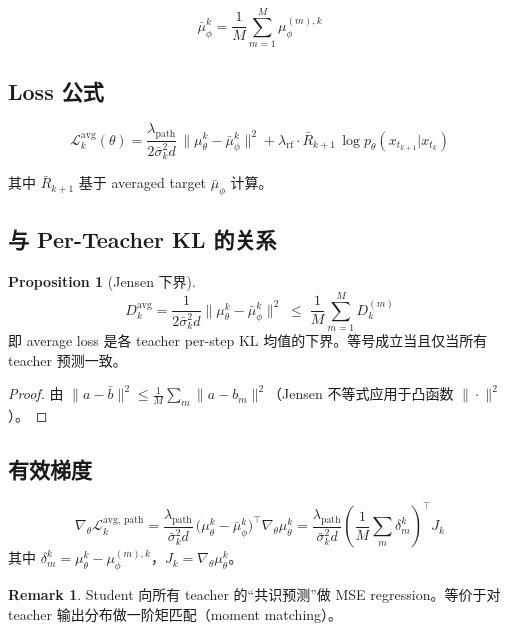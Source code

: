 \documentclass[11pt,a4paper]{article}
\newcommand{\loss}{\mathcal{L}}
\newcommand{\mutheta}{\mu_\theta}
\newcommand{\muphi}{\mu_\phi}
\newcommand{\mubar}{\bar{\mu}_\phi}
\newcommand{\sigbar}{\bar{\sigma}}
\newcommand{\Rbar}{\bar{R}}
\newcommand{\lpath}{\lambda_{\mathrm{path}}}
\newcommand{\lrf}{\lambda_{\mathrm{rf}}}
\theoremstyle{definition}
\newtheorem{remark}{Remark}
\newtheorem{proposition}{Proposition}
\begin{document}
\begin{equation}
\mubar^k = \frac{1}{M}\sum_{m=1}^M \muphi^{(m),k}
\label{eq:mu_avg}
\end{equation}

\subsection{Loss 公式}

\begin{equation}
\boxed{
\loss_k^{\mathrm{avg}}(\theta) = \frac{\lpath}{2\sigbar_k^2 d}\,\bigl\|\mutheta^k - \mubar^k\bigr\|^2
+ \lrf \cdot \Rbar_{k+1}\,\log p_\theta(x_{t_{k+1}}|x_{t_k})
}
\label{eq:loss_avg}
\end{equation}

其中 $\Rbar_{k+1}$ 基于 averaged target $\mubar$ 计算。

\subsection{与 Per-Teacher KL 的关系}

\begin{proposition}[Jensen 下界]
\begin{equation}
D_k^{\mathrm{avg}} = \frac{1}{2\sigbar_k^2 d}\|\mutheta^k - \mubar^k\|^2
\;\leq\; \frac{1}{M}\sum_{m=1}^M D_k^{(m)}
\end{equation}
即 average loss 是各 teacher per-step KL 均值的下界。等号成立当且仅当所有 teacher 预测一致。
\end{proposition}

\begin{proof}
由 $\|a - \bar{b}\|^2 \leq \frac{1}{M}\sum_m \|a - b_m\|^2$（Jensen 不等式应用于凸函数 $\|\cdot\|^2$）。
\end{proof}

\subsection{有效梯度}

\begin{equation}
\nabla_\theta \loss_k^{\mathrm{avg,\,path}} = \frac{\lpath}{\sigbar_k^2 d}\,
\bigl(\mutheta^k - \mubar^k\bigr)^\top \nabla_\theta \mutheta^k
= \frac{\lpath}{\sigbar_k^2 d}\left(\frac{1}{M}\sum_m \delta_m^k\right)^\top J_k
\end{equation}
其中 $\delta_m^k = \mutheta^k - \muphi^{(m),k}$，$J_k = \nabla_\theta \mutheta^k$。

\begin{remark}
Student 向所有 teacher 的``共识预测''做 MSE regression。等价于对 teacher 输出分布做一阶矩匹配（moment matching）。
\end{remark}
\end{document}
